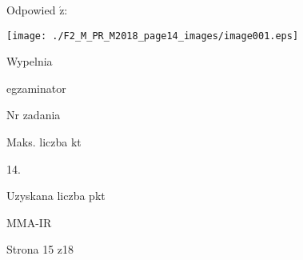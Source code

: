 \documentclass[a4paper,12pt]{article}
\begin{document}
Odpowied $\acute{\mathrm{z}}$:
\begin{center}
\texttt{[image: ./F2\_M\_PR\_M2018\_page14\_images/image001.eps]}
\end{center}
Wypelnia

egzaminator

Nr zadania

Maks. liczba kt

14.

Uzyskana liczba pkt

MMA-IR

Strona 15 z18
\end{document}
